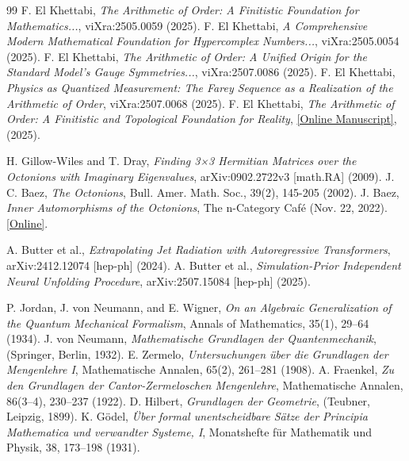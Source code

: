 \documentclass[11pt, a4paper]{article}
\theoremstyle{definition}
\theoremstyle{remark}
\begin{document}
\begin{thebibliography}{99}
     F. El Khettabi, \textit{The Arithmetic of Order: A Finitistic Foundation for Mathematics...}, viXra:2505.0059 (2025).
     F. El Khettabi, \textit{A Comprehensive Modern Mathematical Foundation for Hypercomplex Numbers...}, viXra:2505.0054 (2025).
     F. El Khettabi, \textit{The Arithmetic of Order: A Unified Origin for the Standard Model’s Gauge Symmetries...}, viXra:2507.0086 (2025).
     F. El Khettabi, \textit{Physics as Quantized Measurement: The Farey Sequence as a Realization of the Arithmetic of Order}, viXra:2507.0068 (2025).
     F. El Khettabi, \textit{The Arithmetic of Order: A Finitistic and Topological Foundation for Reality}, \href{http://efaysal.github.io/HCNFEK2024FE/Hardronaoofek_july_2025.pdf}{[Online Manuscript]}, (2025).
    
     H. Gillow-Wiles and T. Dray, \textit{Finding 3×3 Hermitian Matrices over the Octonions with Imaginary Eigenvalues}, arXiv:0902.2722v3 [math.RA] (2009).
     J. C. Baez, \textit{The Octonions}, Bull. Amer. Math. Soc., 39(2), 145-205 (2002).
     J. Baez, \textit{Inner Automorphisms of the Octonions}, The n-Category Café (Nov. 22, 2022). \href{https://golem.ph.utexas.edu/category/2022/11/inner_automorphisms_of_the_oct.html}{[Online]}.
    
     A. Butter et al., \textit{Extrapolating Jet Radiation with Autoregressive Transformers}, arXiv:2412.12074 [hep-ph] (2024).
     A. Butter et al., \textit{Simulation-Prior Independent Neural Unfolding Procedure}, arXiv:2507.15084 [hep-ph] (2025).
    
     P. Jordan, J. von Neumann, and E. Wigner, \textit{On an Algebraic Generalization of the Quantum Mechanical Formalism}, Annals of Mathematics, 35(1), 29–64 (1934).
     J. von Neumann, \textit{Mathematische Grundlagen der Quantenmechanik}, (Springer, Berlin, 1932).
     E. Zermelo, \textit{Untersuchungen über die Grundlagen der Mengenlehre I}, Mathematische Annalen, 65(2), 261–281 (1908).
     A. Fraenkel, \textit{Zu den Grundlagen der Cantor-Zermeloschen Mengenlehre}, Mathematische Annalen, 86(3–4), 230–237 (1922).
     D. Hilbert, \textit{Grundlagen der Geometrie}, (Teubner, Leipzig, 1899).
     K. Gödel, \textit{Über formal unentscheidbare Sätze der Principia Mathematica und verwandter Systeme, I}, Monatshefte für Mathematik und Physik, 38, 173–198 (1931).

\end{thebibliography}
\end{document}
